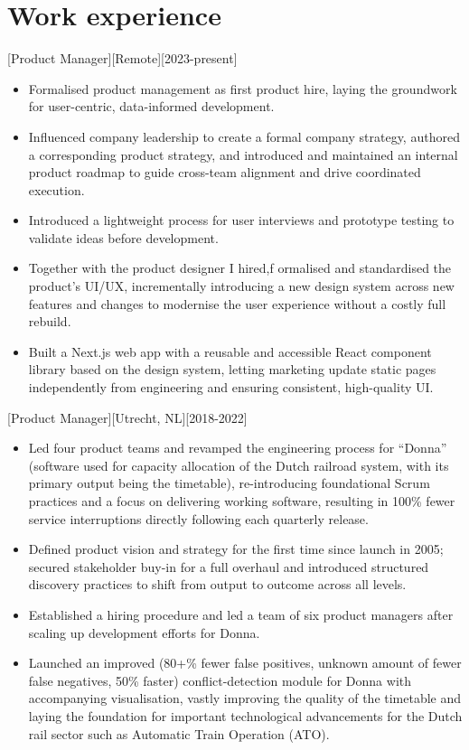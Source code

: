 \documentclass[10pt]{article}
\begin{document}
\makecvtitle

\section{Work experience}
\label{sec:work}

[Product Manager][Remote][2023-present]
\begin{itemize}
    \item Formalised product management as first product hire, laying the groundwork for user-centric, data-informed development.
    \item Influenced company leadership to create a formal company strategy, authored a corresponding product strategy, and introduced and maintained an internal product roadmap to guide cross-team alignment and drive coordinated execution.
    \item Introduced a lightweight process for user interviews and prototype testing to validate ideas before development.
    \item Together with the product designer I hired,f ormalised and standardised the product’s UI/UX, incrementally introducing a new design system across new features and changes to modernise the user experience without a costly full rebuild.
    \item Built a Next.js web app with a reusable and accessible React component library based on the design system, letting marketing update static pages independently from engineering and ensuring consistent, high-quality UI.
\end{itemize}

[Product Manager][Utrecht, NL][2018-2022]
\begin{itemize}
    \item Led four product teams and revamped the engineering process for \enquote{Donna} (software used for capacity allocation of the Dutch railroad system, with its primary output being the timetable), re-introducing foundational Scrum practices and a focus on delivering working software, resulting in 100\% fewer service interruptions directly following each quarterly release.
    \item Defined product vision and strategy for the first time since launch in 2005; secured stakeholder buy-in for a full overhaul and introduced structured discovery practices to shift from output to outcome across all levels.
    \item Established a hiring procedure and led a team of six product managers after scaling up development efforts for Donna.
    \item Launched an improved (80+\% fewer false positives, unknown amount of fewer false negatives, 50\% faster) conflict-detection module for Donna with accompanying visualisation, vastly improving the quality of the timetable and laying the foundation for important technological advancements for the Dutch rail sector such as Automatic Train Operation (ATO).
\end{itemize}
\end{document}
